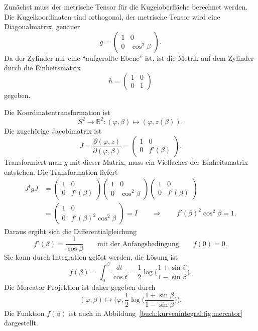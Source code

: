 Zunächst muss der metrische Tensor für die Kugeloberfläche
berechnet werden.
Die Kugelkoordinaten sind orthogonal, der metrische Tensor wird
eine Diagonalmatrix, genauer
\[
g
=
\begin{pmatrix}
 1 & 0           \\
 0 & \cos^2\beta
\end{pmatrix}.
\]
Da der Zylinder nur eine ``aufgerollte Ebene'' ist, ist die Metrik
auf dem Zylinder durch die Einheitsmatrix
\[
h = \begin{pmatrix} 1&0\\0&1\end{pmatrix}
\]
gegeben.

Die Koordinatentransformation ist
\[
S^2\to\mathbb{R}^2
:
(\varphi,\beta) \mapsto (\varphi, z(\beta)).
\]
Die zugehörige Jacobimatrix ist
\[
J
=
\frac{\partial(\varphi,z)}{\partial(\varphi,\beta)}
=
\begin{pmatrix}
 1 & 0 \\
 0 & f'(\beta)
\end{pmatrix}.
\]
Transformiert man $g$ mit dieser Matrix, muss ein Vielfaches der
Einheitsmatrix entstehen.
Die Transformation liefert
\begin{align*}
J^tgJ
&=
\begin{pmatrix}
 1 & 0 \\
 0 & f'(\beta)
\end{pmatrix}
\begin{pmatrix}
 1 & 0           \\
 0 & \cos^2\beta
\end{pmatrix}
\begin{pmatrix}
 1 & 0 \\
 0 & f'(\beta)
\end{pmatrix}
\\
&=
\begin{pmatrix}
1&0\\
0&f'(\beta)^2\cos^2\beta
\end{pmatrix}
=
I
\qquad\Rightarrow\qquad
f'(\beta)^2\cos^2\beta = 1.
\end{align*}
Daraus ergibt sich die Differentialgleichung
\[
f'(\beta)=\frac{1}{\cos \beta}
\qquad\text{mit der Anfangsbedingung}\qquad
f(0)=0.
\]
Sie kann durch Integration gelöst werden, die Lösung ist
\[
f(\beta)
=
\int_0^\beta \frac{dt}{\cos t}
=
\frac12 \log\biggl(
\frac{1+\sin\beta}{1-\sin\beta}
\biggr).
\]
Die Mercator-Projektion ist daher gegeben durch
\begin{equation}
(\varphi,\beta) \mapsto \biggl(
\varphi,\frac12\log\biggl(\frac{1+\sin\beta}{1-\sin\beta}\biggr)
\biggr).
\label{buch:kurvenintegral:differential:eqn:mercatorprojektion}
\end{equation}
%
Die Funktion $f(\beta)$ ist auch in
Abbildung~\ref{buch:kurvenintegral:fig:mercator} dargestellt.
 

